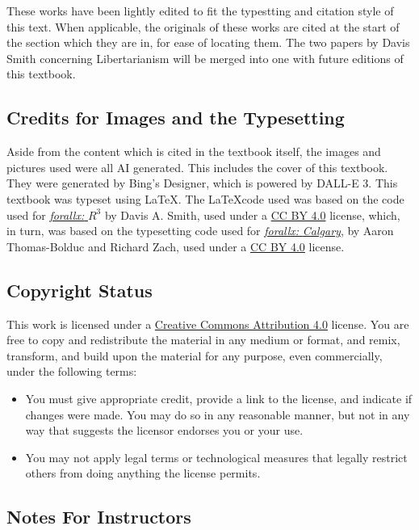These works have been lightly edited to fit the typestting and citation style of this text. When applicable, the originals of these works are cited at the start of the section which they are in, for ease of locating them. The two papers by Davis Smith concerning Libertarianism will be merged into one with future editions of this textbook.

\subsection{Credits for Images and the Typesetting}
Aside from the content which is cited in the textbook itself, the images and pictures used were all AI generated. This includes the cover of this textbook. They were generated by Bing's Designer, which is powered by DALL-E 3. This textbook was typeset using \LaTeX. The \LaTeX  code used was based on the code used for \href{https://github.com/ProfDavisSmith/forallxR3#readme}{\emph{forallx:} \emph{$R^3$}} by Davis A. Smith, used under a 
\href{https://creativecommons.org/licenses/by/4.0/}{CC BY 4.0} license, which, in turn, was based on the typesetting code used for \href{https://forallx.openlogicproject.org/}{\emph{forallx:} \emph{Calgary}}, 
by Aaron Thomas-Bolduc and Richard Zach, used under a 
\href{https://creativecommons.org/licenses/by/4.0/}{CC BY 4.0} license. 

\subsection{Copyright Status}

This work is licensed under a \href{https://creativecommons.org/licenses/by/4.0/}{Creative Commons Attribution 4.0} license.
You are free to copy and redistribute the material in any medium or format, and  remix, transform, and build upon the material for any purpose, even commercially, under the following terms:
\begin{itemize}
\item You must give appropriate credit, provide a link to the license, and indicate if changes were made. You may do so in any reasonable manner, but not in any way that suggests the licensor endorses you or your use.
\item You may not apply legal terms or technological measures that legally restrict others from doing anything the license permits.
\end{itemize}

\subsection{Notes For Instructors}

